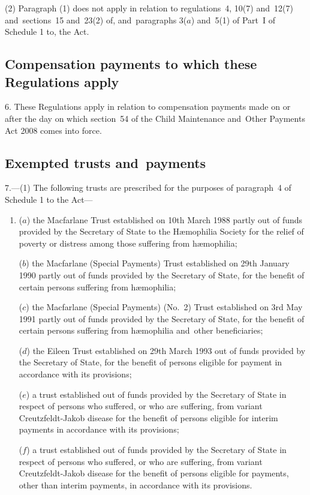 \documentclass[12pt,a4paper]{article}
\begin{document}
(2) Paragraph (1) does not apply in relation to regulations~4, 10(7) and~12(7) and~sections~15 and~23(2) of, and~paragraphs 3($a$)  and~5(1) of Part~I of Schedule 1 to, the Act.

\subsection[6. Compensation payments to which these Regulations apply]{Compensation payments to which these Regulations apply}

6.  These Regulations apply in relation to compensation payments made on or after the day on which section~54 of the Child Maintenance and~Other Payments Act 2008 comes into force.

\subsection[7. Exempted trusts and~payments]{Exempted trusts and~payments}

7.---(1)  The following trusts are prescribed for the purposes of paragraph~4 of Schedule 1 to the Act—
\begin{enumerate}\item[]
($a$) the Macfarlane Trust established on 10th March 1988 partly out of funds provided by the Secretary of State to the H\ae{}mophilia Society for the relief of poverty or distress among those suffering from h\ae{}mophilia;

($b$) the Macfarlane (Special Payments) Trust established on 29th January 1990 partly out of funds provided by the Secretary of State, for the benefit of certain persons suffering from h\ae{}mophilia;

($c$) the Macfarlane (Special Payments) (No.~2) Trust established on 3rd May 1991 partly out of funds provided by the Secretary of State, for the benefit of certain persons suffering from h\ae{}mophilia and~other beneficiaries;

($d$) the Eileen Trust established on 29th March 1993 out of funds provided by the Secretary of State, for the benefit of persons eligible for payment in accordance with its provisions;

($e$) a trust established out of funds provided by the Secretary of State in respect of persons who suffered, or who are suffering, from variant Creutzfeldt-Jakob disease for the benefit of persons eligible for interim payments in accordance with its provisions;

($f$) a trust established out of funds provided by the Secretary of State in respect of persons who suffered, or who are suffering, from variant Creutzfeldt-Jakob disease for the benefit of persons eligible for payments, other than interim payments, in accordance with its provisions.
\end{enumerate}
\end{document}
